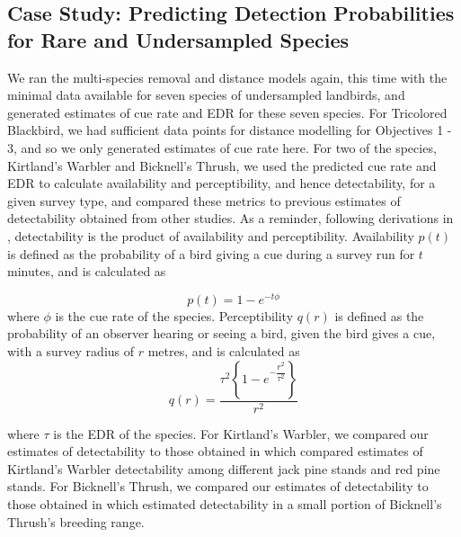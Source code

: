 \documentclass[12pt]{article}
\begin{document}
\subsection{Case Study: Predicting Detection Probabilities for Rare and Undersampled Species}
\par We ran the multi-species removal and distance models again, this time with the minimal data available for seven species of undersampled landbirds, and generated estimates of cue rate and EDR for these seven species.
For Tricolored Blackbird, we had sufficient data points for distance modelling for Objectives 1 - 3, and so we only generated estimates of cue rate here.
For two of the species, Kirtland's Warbler and Bicknell's Thrush, we used the predicted cue rate and EDR to calculate availability and perceptibility, and hence detectability, for a given survey type, and compared these metrics to previous estimates of detectability obtained from other studies.
As a reminder, following derivations in \citet{solymos_calibrating_2013}, detectability is the product of availability and perceptibility.
Availability $p(t)$ is defined as the probability of a bird giving a cue during a survey run for $t$ minutes, and is calculated as

\begin{equation}
	p(t) = 1 - e^{-t\phi}
\end{equation}
where $\phi$ is the cue rate of the species.
Perceptibility $q(r)$ is defined as the probability of an observer hearing or seeing a bird, given the bird gives a cue, with a survey radius of $r$ metres, and is calculated as
\begin{equation}
	q(r) = \dfrac{\tau^2 \left\{1 - e^{-\dfrac{r^2}{\tau^2}}\right\}}{r^2}
\end{equation}

where $\tau$ is the EDR of the species.
For Kirtland's Warbler, we compared our estimates of detectability to those obtained in \citet{van_dyke_comparative_2022} which compared estimates of Kirtland's Warbler detectability among different jack pine stands and red pine stands.
For Bicknell's Thrush, we compared our estimates of detectability to those obtained in \citet{aubry_bicknells_2018} which estimated detectability in a small portion of Bicknell's Thrush's breeding range.
\end{document}
